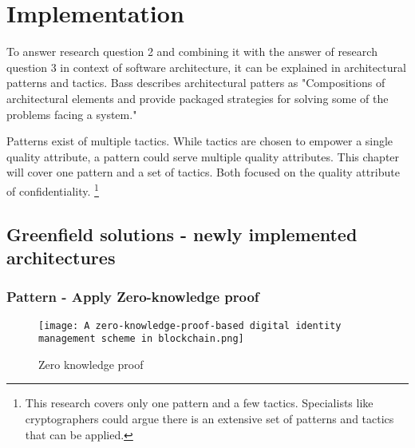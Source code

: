 \chapter{Implementation}\label{s:Implementation}
To answer research question 2 and combining it with the answer of research question 3 in context of software architecture, it can be explained in architectural patterns and tactics. Bass \etal \cite{Bass2015SoftwareAI} describes architectural patters as "Compositions of architectural elements and provide packaged strategies for solving some of the problems facing a system."

Patterns exist of multiple tactics. While tactics are chosen to empower a single quality attribute, a pattern could serve multiple quality attributes. This chapter will cover one pattern and a set of tactics. Both focused on the quality attribute of confidentiality.
\footnote{This research covers only one pattern and a few tactics. Specialists like cryptographers could argue there is an extensive set of patterns and tactics that can be applied.}

\section{Greenfield solutions - newly implemented architectures}
\subsection{Pattern - Apply Zero-knowledge proof}
\graphicspath{ {./images/} }
\begin{figure}[t]
\centering
\label{fig:ZKP}
\texttt{[image: A zero-knowledge-proof-based digital identity management scheme in blockchain.png]}\\
\caption{Zero knowledge proof}
\end{figure}

